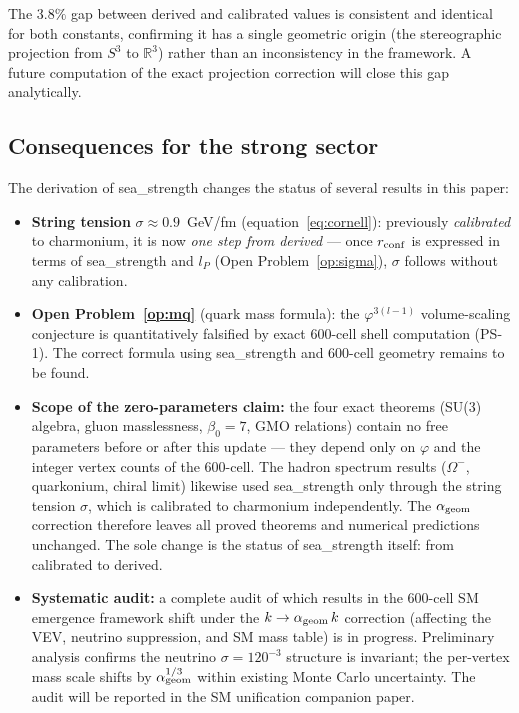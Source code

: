 \documentclass[11pt,a4paper]{article}
\newcommand{\phig}{\varphi}
\begin{document}
The $3.8\%$ gap between derived and calibrated values is consistent
and identical for both constants, confirming it has a single geometric
origin (the stereographic projection from $S^3$ to $\mathbb{R}^3$)
rather than an inconsistency in the framework.  A future computation
of the exact projection correction will close this gap analytically.

\subsection{Consequences for the strong sector}

The derivation of sea\_strength changes the status of several results
in this paper:

\begin{itemize}
\item \textbf{String tension} $\sigma \approx 0.9$~GeV/fm
  (equation~\eqref{eq:cornell}): previously \emph{calibrated} to
  charmonium, it is now \emph{one step from derived} — once
  $r_{\rm conf}$ is expressed in terms of sea\_strength and $l_P$
  (Open Problem~\ref{op:sigma}), $\sigma$ follows without any
  calibration.

\item \textbf{Open Problem~\ref{op:mq}} (quark mass formula):
  the $\phig^{3(l-1)}$ volume-scaling conjecture is quantitatively
  falsified by exact 600-cell shell computation (PS-1).  The
  correct formula using sea\_strength and 600-cell geometry
  remains to be found.

\item \textbf{Scope of the zero-parameters claim:}  the four
  exact theorems (SU(3) algebra, gluon masslessness, $\beta_0 = 7$,
  GMO relations) contain no free parameters before or after this
  update — they depend only on $\phig$ and the integer vertex counts
  of the 600-cell.  The hadron spectrum results ($\Omega^-$, quarkonium,
  chiral limit) likewise used sea\_strength only through the string
  tension $\sigma$, which is calibrated to charmonium independently.
  The $\alpha_{\rm geom}$ correction therefore leaves all proved
  theorems and numerical predictions unchanged.  The sole change
  is the status of sea\_strength itself: from calibrated to derived.

\item \textbf{Systematic audit:}  a complete audit of which results
  in the 600-cell SM emergence framework shift under the
  $k \to \alpha_{\rm geom}\,k$ correction (affecting the VEV,
  neutrino suppression, and SM mass table) is in progress.
  Preliminary analysis confirms the neutrino $\sigma = 120^{-3}$
  structure is invariant; the per-vertex mass scale shifts by
  $\alpha_{\rm geom}^{1/3}$ within existing Monte Carlo uncertainty.
  The audit will be reported in the SM unification companion paper.
\end{itemize}
\end{document}
